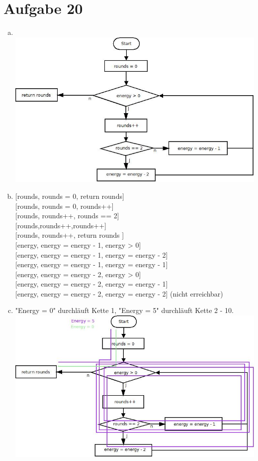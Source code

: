 \section*{Aufgabe 20}

\begin{enumerate} [a)]
	\item\phantom{}\\ \includegraphics[width=\textwidth, height=\textheight, keepaspectratio]{Aufgabe 20.jpeg}
	\item \phantom{} [rounds, rounds = 0, return rounds] \\
	\phantom{} [rounds, rounds = 0, rounds++] \\
		\phantom{}	[rounds, rounds++, rounds == 2] \\
		\phantom{} [rounds,rounds++,rounds++] \\
\phantom{}	[rounds, rounds++, return rounds ]\\
\phantom{}	[energy, energy = energy - 1, energy > 0] \\
\phantom{}	[energy, energy = energy - 1, energy = energy - 2] \\
\phantom{}	[energy, energy = energy - 1, energy = energy - 1] \\
\phantom{}	[energy, energy = energy - 2, energy > 0] \\
\phantom{}	[energy, energy = energy - 2, energy = energy - 1] \\
\phantom{}	[energy, energy = energy - 2, energy = energy - 2] (nicht erreichbar)\\
\pagebreak
\item  "\phantom{}Energy = 0"\phantom{} durchläuft Kette 1, "\phantom{}Energy = 5"\phantom{} durchläuft Kette 2 - 10.\\  \includegraphics[width=\textwidth, height=\textheight, keepaspectratio]{Aufgabe 20 DU.jpeg}
\end{enumerate}
